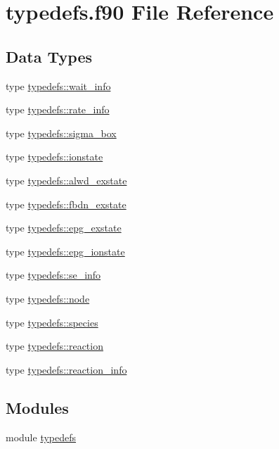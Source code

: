 \hypertarget{typedefs_8f90}{
\section{typedefs.f90 File Reference}
\label{typedefs_8f90}
}
\subsection*{Data Types}
\begin{DoxyCompactItemize}
\item 
type \hyperlink{typetypedefs_1_1wait__info}{typedefs::wait\_\-info}
\item 
type \hyperlink{typetypedefs_1_1rate__info}{typedefs::rate\_\-info}
\item 
type \hyperlink{typetypedefs_1_1sigma__box}{typedefs::sigma\_\-box}
\item 
type \hyperlink{typetypedefs_1_1ionstate}{typedefs::ionstate}
\item 
type \hyperlink{typetypedefs_1_1alwd__exstate}{typedefs::alwd\_\-exstate}
\item 
type \hyperlink{typetypedefs_1_1fbdn__exstate}{typedefs::fbdn\_\-exstate}
\item 
type \hyperlink{typetypedefs_1_1epg__exstate}{typedefs::epg\_\-exstate}
\item 
type \hyperlink{typetypedefs_1_1epg__ionstate}{typedefs::epg\_\-ionstate}
\item 
type \hyperlink{typetypedefs_1_1se__info}{typedefs::se\_\-info}
\item 
type \hyperlink{typetypedefs_1_1node}{typedefs::node}
\item 
type \hyperlink{typetypedefs_1_1species}{typedefs::species}
\item 
type \hyperlink{typetypedefs_1_1reaction}{typedefs::reaction}
\item 
type \hyperlink{typetypedefs_1_1reaction__info}{typedefs::reaction\_\-info}
\end{DoxyCompactItemize}
\subsection*{Modules}
\begin{DoxyCompactItemize}
\item 
module \hyperlink{namespacetypedefs}{typedefs}
\end{DoxyCompactItemize}
